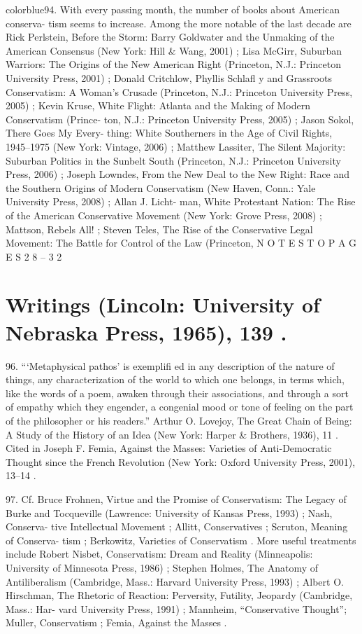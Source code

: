 	{color{blue}94}. With every passing month, the number of books about American conserva- tism seems to increase. Among the more notable of the last decade are Rick Perlstein, Before the Storm: Barry Goldwater and the Unmaking of the American Consensus (New York: Hill & Wang, 2001) ; Lisa McGirr, Suburban Warriors: The Origins of the New American Right (Princeton, N.J.: Princeton University Press, 2001) ; Donald Critchlow, Phyllis Schlafl y and Grassroots Conservatism: A Woman’s Crusade (Princeton, N.J.: Princeton University Press, 2005) ; Kevin Kruse, White Flight: Atlanta and the Making of Modern Conservatism (Prince- ton, N.J.: Princeton University Press, 2005) ; Jason Sokol, There Goes My Every- thing: White Southerners in the Age of Civil Rights, 1945–1975 (New York: Vintage, 2006) ; Matthew Lassiter, The Silent Majority: Suburban Politics in the Sunbelt South (Princeton, N.J.: Princeton University Press, 2006) ; Joseph Lowndes, From the New Deal to the New Right: Race and the Southern Origins of Modern Conservatism (New Haven, Conn.: Yale University Press, 2008) ; Allan J. Licht- man, White Protestant Nation: The Rise of the American Conservative Movement (New York: Grove Press, 2008) ; Mattson, Rebels All! ; Steven Teles, The Rise of the Conservative Legal Movement: The Battle for Control of the Law (Princeton, N O T E S T O P A G E S 2 8 – 3 2


\section{Writings (Lincoln: University of Nebraska Press, 1965), 139 .}


	{\color{blue}96}. “‘Metaphysical pathos’ is exemplifi ed in any description of the nature of things, any characterization of the world to which one belongs, in terms which, like the words of a poem, awaken through their associations, and through a sort of empathy which they engender, a congenial mood or tone of feeling on the part of the philosopher or his readers.” Arthur O. Lovejoy, The Great Chain of Being: A Study of the History of an Idea (New York: Harper & Brothers, 1936), 11 . Cited in Joseph F. Femia, Against the Masses: Varieties of Anti-Democratic Thought since the French Revolution (New York: Oxford University Press, 2001), 13–14 .


	{\color{blue}97}. Cf. Bruce Frohnen, Virtue and the Promise of Conservatism: The Legacy of Burke and Tocqueville (Lawrence: University of Kansas Press, 1993) ; Nash, Conserva- tive Intellectual Movement ; Allitt, Conservatives ; Scruton, Meaning of Conserva- tism ; Berkowitz, Varieties of Conservatism . More useful treatments include Robert Nisbet, Conservatism: Dream and Reality (Minneapolis: University of Minnesota Press, 1986) ; Stephen Holmes, The Anatomy of Antiliberalism (Cambridge, Mass.: Harvard University Press, 1993) ; Albert O. Hirschman, The Rhetoric of Reaction: Perversity, Futility, Jeopardy (Cambridge, Mass.: Har- vard University Press, 1991) ; Mannheim, “Conservative Thought”; Muller, Conservatism ; Femia, Against the Masses .


